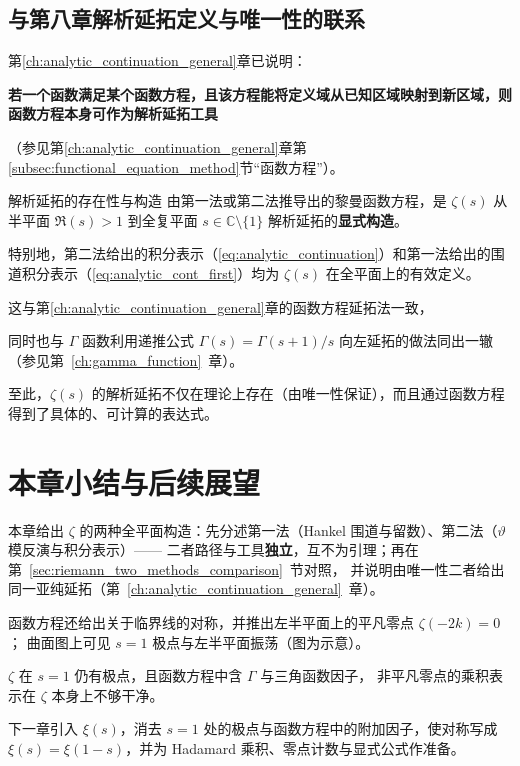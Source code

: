 \subsection{与第八章解析延拓定义与唯一性的联系}

第\ref{ch:analytic_continuation_general}章已说明：

\textbf{若一个函数满足某个函数方程，且该方程能将定义域从已知区域映射到新区域，则函数方程本身可作为解析延拓工具}

（参见第\ref{ch:analytic_continuation_general}章第\ref{subsec:functional_equation_method}节“函数方程”）。
\begin{theorem}{解析延拓的存在性与构造}{}
  由第一法或第二法推导出的黎曼函数方程，是 $\zeta(s)$ 从半平面 $\Re(s)>1$ 到全复平面 $s \in \mathbb{C} \setminus \{1\}$ 解析延拓的\textbf{显式构造}。

  特别地，第二法给出的积分表示（\eqref{eq:analytic_continuation}）和第一法给出的围道积分表示（\eqref{eq:analytic_cont_first}）均为 $\zeta(s)$ 在全平面上的有效定义。
\end{theorem}

这与第\ref{ch:analytic_continuation_general}章的函数方程延拓法一致，

同时也与 $\Gamma$ 函数利用递推公式 $\Gamma(s)=\Gamma(s+1)/s$ 向左延拓的做法同出一辙（参见第~\ref{ch:gamma_function}~章）。

至此，$\zeta(s)$ 的解析延拓不仅在理论上存在（由唯一性保证），而且通过函数方程得到了具体的、可计算的表达式。

\section*{本章小结与后续展望}

本章给出 $\zeta$ 的两种全平面构造：先分述第一法（Hankel 围道与留数）、第二法（$\vartheta$ 模反演与积分表示）——
二者路径与工具\textbf{独立}，互不为引理；再在第~\ref{sec:riemann_two_methods_comparison}~节对照，
并说明由唯一性二者给出同一亚纯延拓（第~\ref{ch:analytic_continuation_general}~章）。

函数方程还给出关于临界线的对称，并推出左半平面上的平凡零点 $\zeta(-2k)=0$；
曲面图上可见 $s=1$ 极点与左半平面振荡（图为示意）。

$\zeta$ 在 $s=1$ 仍有极点，且函数方程中含 $\Gamma$ 与三角函数因子，
非平凡零点的乘积表示在 $\zeta$ 本身上不够干净。

下一章引入 $\xi(s)$，消去 $s=1$ 处的极点与函数方程中的附加因子，使对称写成
$\xi(s)=\xi(1-s)$，并为 Hadamard 乘积、零点计数与显式公式作准备。


